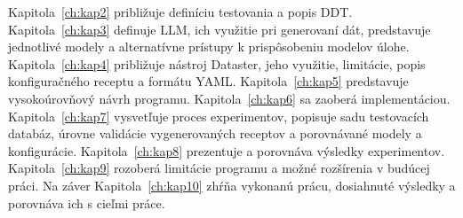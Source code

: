 Kapitola~\ref{ch:kap2} približuje definíciu testovania a popis DDT. Kapitola~\ref{ch:kap3} definuje LLM, ich využitie pri generovaní dát, predstavuje jednotlivé modely a alternatívne prístupy k prispôsobeniu modelov úlohe. Kapitola~\ref{ch:kap4} približuje nástroj Dataster, jeho využitie, limitácie, popis konfiguračného receptu a formátu YAML. Kapitola~\ref{ch:kap5} predstavuje vysokoúrovňový návrh programu. Kapitola~\ref{ch:kap6} sa zaoberá implementáciou. Kapitola~\ref{ch:kap7} vysvetľuje proces experimentov, popisuje sadu testovacích databáz, úrovne validácie vygenerovaných receptov a porovnávané modely a konfigurácie. Kapitola~\ref{ch:kap8} prezentuje a porovnáva výsledky experimentov. Kapitola~\ref{ch:kap9} rozoberá limitácie programu a možné rozšírenia v budúcej práci. Na záver Kapitola~\ref{ch:kap10} zhŕňa vykonanú prácu, dosiahnuté výsledky a porovnáva ich s cieľmi práce.

